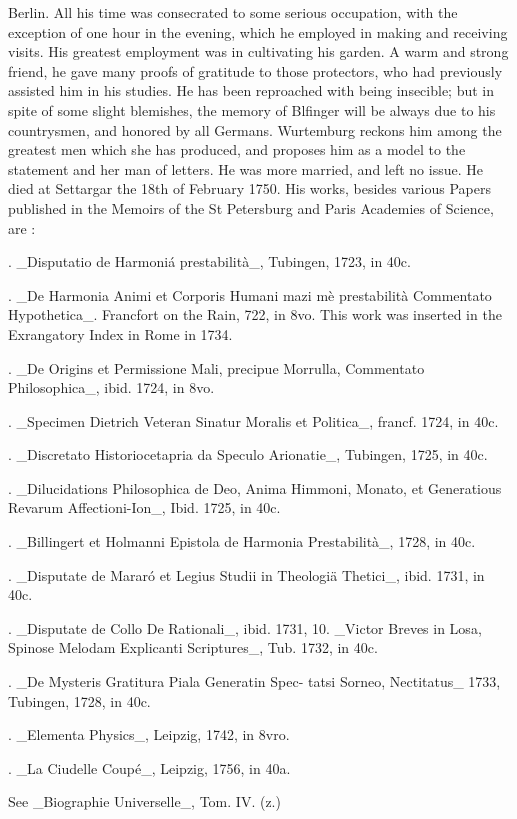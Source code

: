 Berlin. All his time was consecrated to some serious occupation, with the exception of one hour in the evening, which he employed in making and receiving visits. His greatest employment was in cultivating his garden. A warm and strong friend, he gave many proofs of gratitude to those protectors, who had previously assisted him in his studies. He has been reproached with being insecible; but in spite of some slight blemishes, the memory of Blfinger will be always due to his countrysmen, and honored by all Germans. Wurtemburg reckons him among the greatest men which she has produced, and proposes him as a model to the statement and her man of letters. He was more married, and left no issue. He died at Settargar the 18th of February 1750. His works, besides various Papers published in the Memoirs of the St Petersburg and Paris Academies of Science, are :\par{}. \_Disputatio de Harmoniá prestabilità\_, Tubingen, 1723, in 40c.\par{}. \_De Harmonia Animi et Corporis Humani mazi mè prestabilità Commentato Hypothetica\_. Francfort on the Rain, 722, in 8vo. This work was inserted in the Exrangatory Index in Rome in 1734.\par{}. \_De Origins et Permissione Mali, precipue Morrulla, Commentato Philosophica\_, ibid. 1724, in 8vo.\par{}. \_Specimen Dietrich Veteran Sinatur Moralis et Politica\_, francf. 1724, in 40c.\par{}. \_Discretato Historiocetapria da Speculo Arionatie\_, Tubingen, 1725, in 40c.\par{}. \_Dilucidations Philosophica de Deo, Anima Himmoni, Monato, et Generatious Revarum Affectioni-Ion\_, Ibid. 1725, in 40c.\par{}. \_Billingert et Holmanni Epistola de Harmonia Prestabilità\_, 1728, in 40c.\par{}. \_Disputate de Mararó et Legius Studii in Theologiä Thetici\_, ibid. 1731, in 40c.\par{}. \_Disputate de Collo De Rationali\_, ibid. 1731, 10. \_Victor Breves in Losa, Spinose Melodam Explicanti Scriptures\_, Tub. 1732, in 40c.\par{}. \_De Mysteris Gratitura Piala Generatin Spec- tatsi Sorneo, Nectitatus\_ 1733, Tubingen, 1728, in 40c.\par{}. \_Elementa Physics\_, Leipzig, 1742, in 8vro.\par{}. \_La Ciudelle Coupé\_, Leipzig, 1756, in 40a.\par\medskip
See \_Biographie Universelle\_, Tom. IV. (z.)\par\medskip
